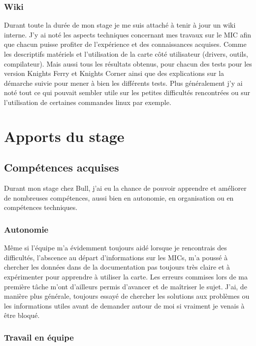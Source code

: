\documentclass{article}
\begin{document}
			\subsubsection{Wiki}
			Durant toute la durée de mon stage je me suis attaché à tenir à jour un wiki interne. J'y ai noté les aspects techniques 
			concernant mes travaux sur le MIC afin que chacun puisse profiter de l'expérience et des connaissances acquises. 
			Comme les descriptifs matériels et l'utilisation de la carte côté utilisateur (drivers, outils, compilateur).
			Mais aussi tous les résultats obtenus, pour chacun des tests pour les version Knights Ferry et Knights Corner ainsi 
			que des explications sur la démarche suivie pour mener à bien les différents tests. \newline
			Plus généralement j'y ai noté tout ce qui pouvait sembler utile sur les petites difficultés rencontrées ou sur l'utilisation 
			de certaines commandes linux par exemple.
	\section{Apports du stage}
		\subsection{Compétences acquises}
		Durant mon stage chez Bull, j'ai eu la chance de pouvoir apprendre et améliorer de nombreuses compétences, aussi bien 
		en autonomie, en organisation ou en compétences techniques.
			\subsubsection{Autonomie}
			Même si l'équipe m'a évidemment toujours aidé lorsque je rencontrais des difficultés, l'abscence au départ 
			d'informations sur les MICs, m'a poussé à chercher les données dans de la documentation pas toujours très claire et à 
			expérimenter pour apprendre à utiliser la carte. Les erreurs commises lors de ma première tâche m'ont d'ailleurs permis d'avancer 
			et de maîtriser le sujet. J'ai, de manière plus générale, toujours essayé de chercher les solutions aux problèmes ou les 
			informations utiles avant de demander autour de moi si vraiment je venais à être bloqué.
			\subsubsection{Travail en équipe}
\end{document}
